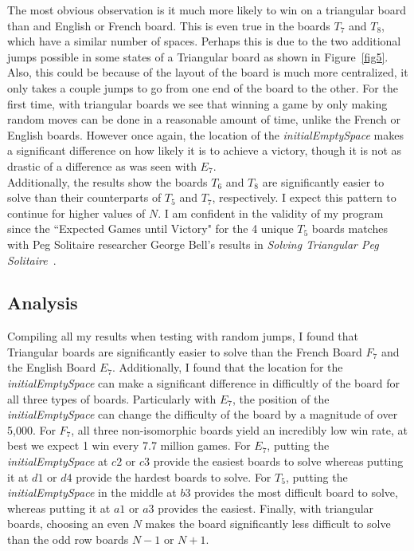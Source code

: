 \documentclass{article}
\newcommand\tab[1][.5cm]{\hspace*{#1}}
\begin{document}
The most obvious observation is it much more likely to win on a triangular board than and English or French board. This is even true in the boards $T_7$ and $T_8$, which have a similar number of spaces. Perhaps this is due to the two additional jumps possible in some states of a Triangular board as shown in Figure~\ref{fig5}. Also, this could be because of the layout of the board is much more centralized, it only takes a couple jumps to go from one end of the board to the other. For the first time, with triangular boards we see that winning a game by only making random moves can be done in a reasonable amount of time, unlike the French or English boards. However once again, the location of the \textit{initialEmptySpace} makes a significant difference on how likely it is to achieve a victory, though it is not as drastic of a difference as was seen with $E_7$.\\
\tab Additionally, the results show the boards $T_6$ and $T_8$ are significantly easier to solve than their counterparts of $T_5$ and $T_7$, respectively. I expect this pattern to continue for higher values of $N$. I am confident in the validity of my program since the ``Expected Games until Victory" for the 4 unique $T_5$ boards matches with Peg Solitaire researcher George Bell's results in \textit{Solving Triangular Peg Solitaire}~\cite{Bell}.

\subsection{Analysis}
Compiling all my results when testing with random jumps, I found that Triangular boards are significantly easier to solve than the French Board $F_7$ and the English Board $E_7$. Additionally, I found that the location for the \textit{initialEmptySpace} can make a significant difference in difficultly of the board for all three types of boards. Particularly with $E_7$, the position of the \textit{initialEmptySpace} can change the difficulty of the board by a magnitude of over 5,000. For $F_7$, all three non-isomorphic boards yield an incredibly low win rate, at best we expect 1 win every 7.7 million games. For $E_7$, putting the \textit{initialEmptySpace} at $c2$ or $c3$ provide the easiest boards to solve whereas putting it at $d1$ or $d4$ provide the hardest boards to solve. For $T_5$, putting the \textit{initialEmptySpace} in the middle at $b3$ provides the most difficult board to solve, whereas putting it at $a1$ or $a3$ provides the easiest. Finally, with triangular boards, choosing an even $N$ makes the board significantly less difficult to solve than the odd row boards $N-1$ or $N+1$.
 
\end{document}
